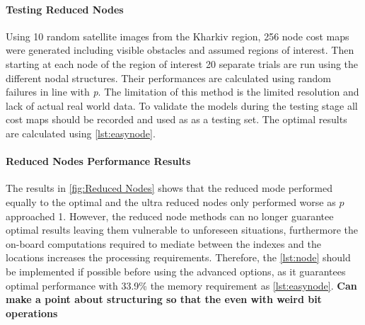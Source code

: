 \paragraph{Testing Reduced Nodes}
Using 10 random satellite images from the Kharkiv region, 256 node cost maps were generated including visible obstacles and assumed regions of interest. Then starting at each node of the region of interest 20 separate trials are run using the different nodal structures. Their performances are calculated using random failures in line with \textit{p}. The limitation of this method is the limited resolution and lack of actual real world data. To validate the models during the testing stage all cost maps should be recorded and used as as a testing set. The optimal results are calculated using \ref{lst:easynode}.

\paragraph{Reduced Nodes Performance Results}
The results in \ref{fig:Reduced Nodes} shows that the reduced mode performed equally to the optimal and the ultra reduced nodes only performed worse as $p$ approached 1. However, the reduced node methods can no longer guarantee optimal results leaving them vulnerable to unforeseen situations, furthermore the on-board computations required to mediate between the indexes and the locations increases the processing requirements. Therefore, the \ref{lst:node} should be implemented if possible before using the advanced options, as it guarantees optimal performance with 33.9\% the memory requirement as \ref{lst:easynode}.
\textbf{Can make a point about structuring so that the even with weird bit operations}


